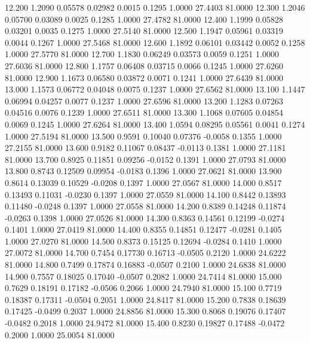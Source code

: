   12.200   1.2090   0.05578   0.02982   0.0015   0.1295   1.0000  27.4403  81.0000
  12.300   1.2046   0.05700   0.03089   0.0025   0.1285   1.0000  27.4782  81.0000
  12.400   1.1999   0.05828   0.03201   0.0035   0.1275   1.0000  27.5140  81.0000
  12.500   1.1947   0.05961   0.03319   0.0044   0.1267   1.0000  27.5468  81.0000
  12.600   1.1892   0.06101   0.03442   0.0052   0.1258   1.0000  27.5770  81.0000
  12.700   1.1830   0.06249   0.03573   0.0059   0.1251   1.0000  27.6036  81.0000
  12.800   1.1757   0.06408   0.03715   0.0066   0.1245   1.0000  27.6260  81.0000
  12.900   1.1673   0.06580   0.03872   0.0071   0.1241   1.0000  27.6439  81.0000
  13.000   1.1573   0.06772   0.04048   0.0075   0.1237   1.0000  27.6562  81.0000
  13.100   1.1447   0.06994   0.04257   0.0077   0.1237   1.0000  27.6596  81.0000
  13.200   1.1283   0.07263   0.04516   0.0076   0.1239   1.0000  27.6511  81.0000
  13.300   1.1068   0.07605   0.04854   0.0069   0.1245   1.0000  27.6264  81.0000
  13.400   1.0594   0.08295   0.05561   0.0041   0.1274   1.0000  27.5194  81.0000
  13.500   0.9591   0.10040   0.07376  -0.0058   0.1355   1.0000  27.2155  81.0000
  13.600   0.9182   0.11067   0.08437  -0.0113   0.1381   1.0000  27.1181  81.0000
  13.700   0.8925   0.11851   0.09256  -0.0152   0.1391   1.0000  27.0793  81.0000
  13.800   0.8743   0.12509   0.09954  -0.0183   0.1396   1.0000  27.0621  81.0000
  13.900   0.8614   0.13039   0.10529  -0.0208   0.1397   1.0000  27.0567  81.0000
  14.000   0.8517   0.13493   0.11031  -0.0230   0.1397   1.0000  27.0559  81.0000
  14.100   0.8442   0.13893   0.11480  -0.0248   0.1397   1.0000  27.0558  81.0000
  14.200   0.8389   0.14248   0.11874  -0.0263   0.1398   1.0000  27.0526  81.0000
  14.300   0.8363   0.14561   0.12199  -0.0274   0.1401   1.0000  27.0419  81.0000
  14.400   0.8355   0.14851   0.12477  -0.0281   0.1405   1.0000  27.0270  81.0000
  14.500   0.8373   0.15125   0.12694  -0.0284   0.1410   1.0000  27.0072  81.0000
  14.700   0.7454   0.17730   0.16713  -0.0505   0.2120   1.0000  24.6222  81.0000
  14.800   0.7499   0.17874   0.16883  -0.0507   0.2100   1.0000  24.6838  81.0000
  14.900   0.7557   0.18025   0.17040  -0.0507   0.2082   1.0000  24.7414  81.0000
  15.000   0.7629   0.18191   0.17182  -0.0506   0.2066   1.0000  24.7940  81.0000
  15.100   0.7719   0.18387   0.17311  -0.0504   0.2051   1.0000  24.8417  81.0000
  15.200   0.7838   0.18639   0.17425  -0.0499   0.2037   1.0000  24.8856  81.0000
  15.300   0.8068   0.19076   0.17407  -0.0482   0.2018   1.0000  24.9472  81.0000
  15.400   0.8230   0.19827   0.17488  -0.0472   0.2000   1.0000  25.0054  81.0000
